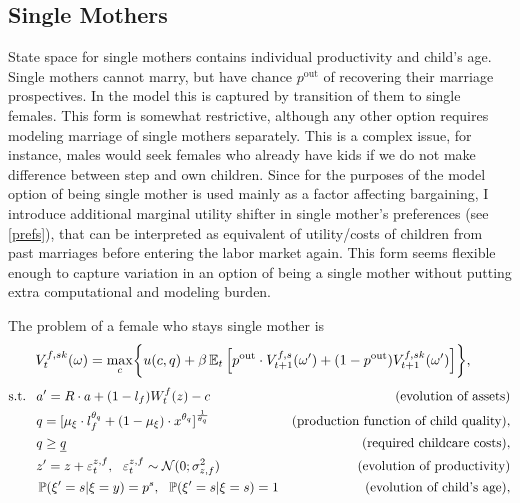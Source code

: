 \subsection{Single Mothers}
State space for single mothers contains individual productivity and child's age. Single mothers cannot marry, but have chance $p^{\text{out}}$ of recovering their marriage prospectives. In the model this is captured by transition of them to single females. This form is somewhat restrictive, although any other option requires modeling marriage of single mothers separately. This is a complex issue, for instance, males would seek females who already have kids if we do not make difference between step and own children. Since for the purposes of the model option of being single mother is used mainly as a factor affecting bargaining, I introduce additional marginal utility shifter in single mother's preferences (see \ref{prefs}), that can be interpreted as equivalent of utility/costs of children from past marriages before entering the labor market again.  This form seems flexible enough to capture variation in an option of being a single mother without putting extra computational and modeling burden.

The problem of a female who stays single mother is
\begin{align}V^{f,sk}_t(\omega) = \max\limits_{c} & \bigg\{ u(c,q) + \beta \E_t \Big[ p^{\text{out}} \cdot  V^{f,s}_{t+1}(\omega') +(1-p^{\text{out}})V^{f,sk}_{t+1}(\omega') \Big]  \bigg\},
\end{align}\vspace{-1em}
\begin{align*}
 \text{s.t. \ }  &  a' = R\cdot a  + (1-l_f)W^f_t(z) - c  & \text{ (evolution of assets)}\\
 & q = [\mu_\xi\cdot l_f^{\theta_q} + (1-\mu_\xi)\cdot x^{\theta_q}]^{\frac1{\theta_q}} & \text{(production function of child quality)},\\
& q \geq \underline{q} & \text{(required childcare costs)},\\
 &  z' = z + \varepsilon^{z,f}_t, \ \ \varepsilon^{z,f}_t \sim \mathcal{N}(0;\sigma_{z,f}^2) &  \text{ (evolution of productivity)}\\
 &  \P(\xi' = s | \xi = y) = p^s, \ \ \P(\xi' = s | \xi = s) = 1 & \text{(evolution of child's age)},\\
\end{align*}

